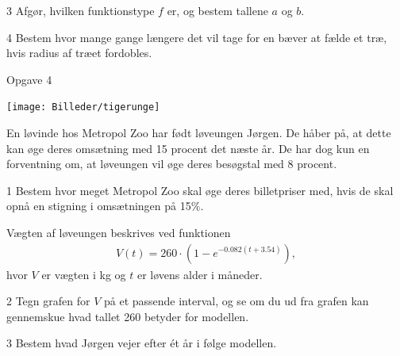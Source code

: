 \begin{delopgave}{}{3}
	Afgør, hvilken funktionstype $f$ er, og bestem tallene $a$ og $b$. 
\end{delopgave}
\begin{delopgave}{}{4}
	Bestem hvor mange gange længere det vil tage for en bæver at fælde et træ, hvis radius af 
	træet fordobles.
\end{delopgave}
\newpage
\begin{opgavetekst}{Opgave 4}
	\begin{center}
		\texttt{[image: Billeder/tigerunge]}
	\end{center}
	En løvinde hos Metropol Zoo har født løveungen Jørgen. De håber på, at dette kan øge
	 deres omsætning med 15 procent det næste år. De har dog kun en forventning
	 om, at løveungen vil øge deres besøgstal med 8 procent. 
\end{opgavetekst}
\begin{delopgave}{}{1}
	Bestem hvor meget Metropol Zoo skal øge deres billetpriser med, hvis de skal opnå en
	stigning i omsætningen på 15$\%$. 
\end{delopgave}
\begin{meretekst}
	Vægten af løveungen beskrives ved funktionen
	\begin{align*}
		V(t) = 260\cdot(1-e^{-0.082(t+3.54)}),
	\end{align*}
	hvor $V$ er vægten i kg og $t$ er løvens alder i måneder. 
\end{meretekst}
%
\begin{delopgave}{}{2}
	Tegn grafen for $V$ på et passende interval, og se om du ud fra grafen kan
	gennemskue hvad tallet 260 betyder for modellen. 
\end{delopgave}
%
\begin{delopgave}{}{3}
	Bestem hvad Jørgen vejer efter ét år i følge modellen.
\end{delopgave}
